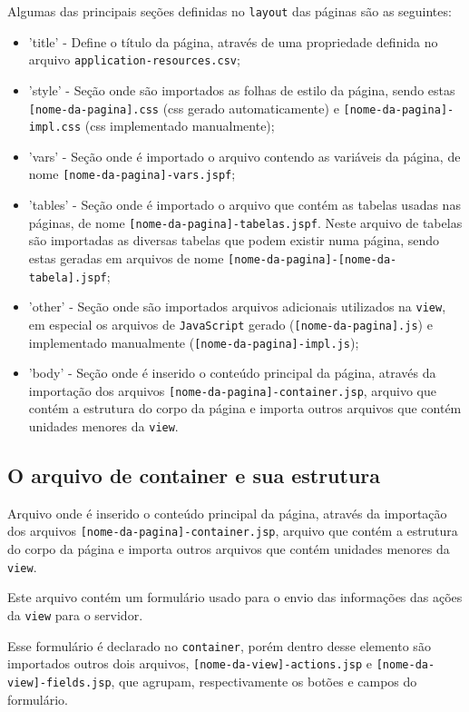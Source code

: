 Algumas das principais seções definidas no \texttt{layout} das páginas são as
seguintes:
\begin{itemize}
  \item 'title' - Define o título da página, através de uma propriedade definida
  no arquivo \texttt{application-resources.csv};
  \item 'style' - Seção onde são importados as folhas de estilo da página, sendo
  estas \texttt{[nome-da-pagina].css} (css gerado automaticamente) e
  \texttt{[nome-da-pagina]-impl.css} (css implementado manualmente);
  \item 'vars' - Seção onde é importado o arquivo contendo as variáveis da
  página, de nome \texttt{[nome-da-pagina]-vars.jspf};
  \item 'tables' - Seção onde é importado o arquivo que contém as tabelas usadas
  nas páginas, de nome \texttt{[nome-da-pagina]-tabelas.jspf}. Neste arquivo de
  tabelas são importadas as diversas tabelas que podem existir numa página,
  sendo estas geradas em arquivos de nome
  \texttt{[nome-da-pagina]-[nome-da-tabela].jspf};
  \item 'other' - Seção onde são importados arquivos adicionais utilizados na
  \texttt{view}, em especial os arquivos de \texttt{JavaScript} gerado
  (\texttt{[nome-da-pagina].js}) e implementado manualmente
  (\texttt{[nome-da-pagina]-impl.js});
  \item 'body' - Seção onde é inserido o conteúdo principal da página, através
  da importação dos arquivos \texttt{[nome-da-pagina]-container.jsp}, arquivo
  que contém a estrutura do corpo da página e importa outros arquivos que
  contém unidades menores da \texttt{view}.
\end{itemize}

\subsection{O arquivo de container e sua estrutura}
Arquivo onde é inserido o conteúdo principal da página, através da importação
dos arquivos \texttt{[nome-da-pagina]-container.jsp}, arquivo que contém a estrutura
do corpo da página e importa outros arquivos que contém unidades menores da
\texttt{view}.

Este arquivo contém um formulário usado para o envio das informações das ações
da \texttt{view} para o servidor. 

Esse formulário é declarado no
\texttt{container}, porém dentro desse elemento são importados outros dois
arquivos, \texttt{[nome-da-view]-actions.jsp} e
\texttt{[nome-da-view]-fields.jsp}, que agrupam, respectivamente os botões e
campos do formulário.
